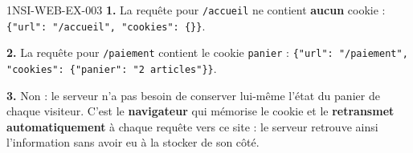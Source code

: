 \begin{corrige}{1NSI-WEB-EX-003}
\textbf{1.} La requête pour \lstinline{/accueil} ne contient \textbf{aucun} cookie :
\lstinline|{"url": "/accueil", "cookies": {}}|.

\textbf{2.} La requête pour \lstinline{/paiement} contient le cookie \lstinline{panier} :
\lstinline|{"url": "/paiement", "cookies": {"panier": "2 articles"}}|.

\textbf{3.} Non : le serveur n'a pas besoin de conserver lui-même l'état du panier de
chaque visiteur. C'est le \textbf{navigateur} qui mémorise le cookie et le
\textbf{retransmet automatiquement} à chaque requête vers ce site : le serveur retrouve
ainsi l'information sans avoir eu à la stocker de son côté.
\end{corrige}
